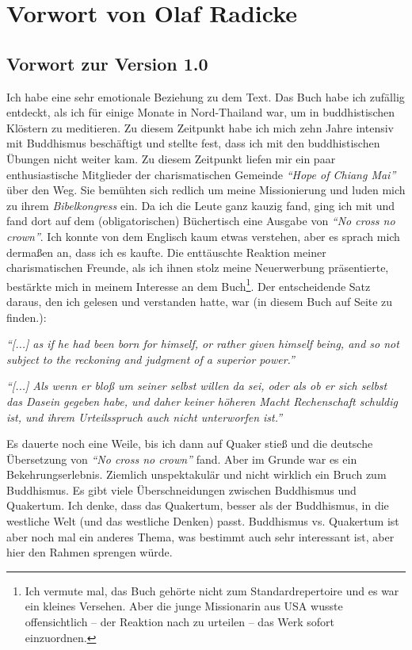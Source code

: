 \part{Vorwort von Olaf Radicke}

\chapter{Vorwort zur Version 1.0}
Ich habe eine sehr emotionale Beziehung zu dem Text. Das Buch habe ich zufällig
entdeckt, als ich für einige Monate in Nord-Thailand war, um in
buddhistischen Klöstern zu meditieren. Zu diesem Zeitpunkt habe
ich mich zehn Jahre intensiv mit Buddhismus beschäftigt und stellte fest, dass ich mit den buddhistischen Übungen
nicht weiter kam. Zu diesem Zeitpunkt liefen mir ein paar enthusiastische
Mitglieder der charismatischen Gemeinde \textit{"`Hope of Chiang Mai"'} über
den Weg. Sie bemühten sich redlich um meine Missionierung und luden mich zu
ihrem \textit{Bibelkongress} ein. Da ich die Leute ganz kauzig fand, ging ich
mit und fand dort auf dem (obligatorischen) Büchertisch eine Ausgabe
von \textit{"`No cross no crown"'}.
Ich konnte von dem Englisch kaum etwas verstehen, aber es sprach mich dermaßen
an, dass ich es kaufte. Die enttäuschte Reaktion meiner charismatischen Freunde,
als ich ihnen stolz meine Neuerwerbung präsentierte, bestärkte mich in meinem
Interesse an dem Buch\footnote{Ich vermute mal, das Buch gehörte nicht zum
Standardrepertoire und es war ein kleines Versehen. Aber die junge Missionarin
aus USA wusste offensichtlich -- der Reaktion nach zu urteilen -- das Werk
sofort einzuordnen.}. Der entscheidende Satz daraus, den ich gelesen und
verstanden hatte, war (in diesem Buch auf
Seite \pageref{ref:vorw_sinndes_lebens} zu finden.):

\begin{center}
\parbox{7,5cm}{
\textit{"`[...] as if he had been born for himself, or rather given himself being,
and so not subject to the reckoning and judgment of a superior power."'}

\medskip

\textit{"`[...] Als wenn er bloß um seiner selbst willen da sei, oder als ob er
sich selbst das Dasein gegeben habe, und daher keiner höheren Macht Rechenschaft
schuldig ist, und ihrem Urteilsspruch auch nicht unterworfen ist."'}
}
\end{center}

\medskip

Es dauerte noch eine Weile, bis ich dann auf Quaker stieß und die deutsche
Übersetzung von \textit{"`No cross no crown"'} fand. Aber im Grunde war es ein
Bekehrungserlebnis. Ziemlich unspektakulär und nicht wirklich ein Bruch zum
Buddhismus. Es gibt viele Überschneidungen zwischen Buddhismus und Quakertum.
Ich denke, dass das Quakertum, besser als der Buddhismus, in die westliche Welt
(und das westliche
Denken) passt. Buddhismus vs. Quakertum ist aber noch mal
ein anderes Thema, was bestimmt auch sehr interessant ist, aber hier den Rahmen
sprengen würde.

